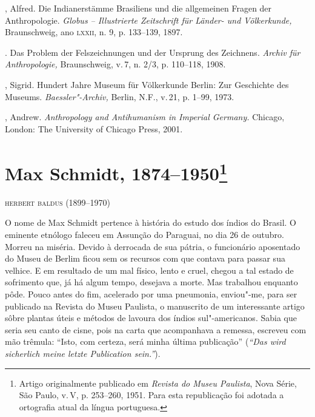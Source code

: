 \begin{bibliohedra}
, Alfred. Die Indianerstämme Brasiliens und die allgemeinen
Fragen der Anthropologie. \textit{Globus -- Illustrierte Zeitschrift für
Länder- und Völkerkunde,} Braunschweig, ano \textsc{lxxii}, n. 9, p. 133--139,
1897.

\titidem. Das Problem der Felszeichnungen und der Ursprung
des Zeichnens. \textit{Archiv für Anthropologie,} Braunschweig, v.\,7,
n. 2/3, p. 110--118, 1908.

, Sigrid. Hundert Jahre Museum für Völkerkunde Berlin:
Zur Geschichte des Museums. \textit{Baessler"-Archiv,} Berlin, N.F., v.\,21, p. 1--99, 1973.

, Andrew. \textit{Anthropology and Antihumanism in Imperial
Germany.} Chicago, London: The University of Chicago Press, 2001.
\end{bibliohedra}

\chapter[Max Schmidt, 1874--1950, \emph{por Herbert Baldus}]{Max Schmidt, 1874--1950\footnote[*]{Artigo originalmente publicado
  em \emph{Revista do Museu Paulista}, Nova Série, São Paulo, v.\,V, p.
  253--260, 1951. Para esta republicação foi adotada a ortografia atual
  da língua portuguesa.}}

\begin{flushright}
\textsc{herbert baldus (1899--1970)}\medskip
\end{flushright}

O nome de Max Schmidt pertence à história do estudo dos índios do
Brasil. O eminente etnólogo faleceu em Assunção do Paraguai, no dia 26
de outubro. Morreu na miséria. Devido à derrocada de sua pátria, o
funcionário aposentado do Museu de Berlim ficou sem os recursos com que
contava para passar sua velhice. E em resultado de um mal físico, lento
e cruel, chegou a tal estado de sofrimento que, já há algum tempo,
desejava a morte. Mas trabalhou enquanto pôde. Pouco antes do fim,
acelerado por uma pneumonia, enviou"-me, para ser publicado na Revista
do Museu Paulista, o manuscrito de um interessante artigo sôbre plantas
úteis e métodos de lavoura dos índios sul"-americanos. Sabia que seria
seu canto de cisne, pois na carta que acompanhava a remessa, escreveu
com mão trêmula: ``Isto, com certeza, será minha última publicação''
(\emph{``Das wird sicherlich meine letzte Publication sein.''}).

